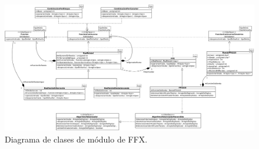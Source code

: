\begin{figure}
  \begin{center}
    \includegraphics[width=1.0\linewidth]{diagramas/ffx.png}
    \caption{Diagrama de clases de módulo de FFX.}
    \label{clases_ffx}
  \end{center}
\end{figure}
